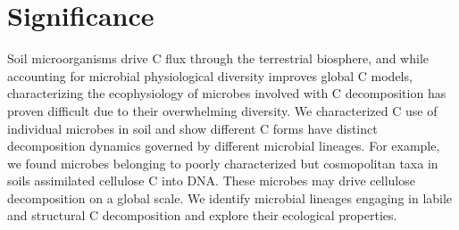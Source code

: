 \section{Significance} Soil microorganisms drive C flux through the terrestrial
biosphere, and while accounting for microbial physiological diversity improves
global C models, characterizing the ecophysiology of microbes involved with
C decomposition has proven difficult due to their overwhelming diversity. We
characterized C use of individual microbes in soil and show different C forms
have distinct decomposition dynamics governed by different microbial lineages.
For example, we found microbes belonging to poorly characterized but
cosmopolitan taxa in soils assimilated cellulose C into DNA. These microbes may
drive cellulose decomposition on a global scale. We identify microbial lineages
engaging in labile and structural C decomposition and explore their ecological
properties.
